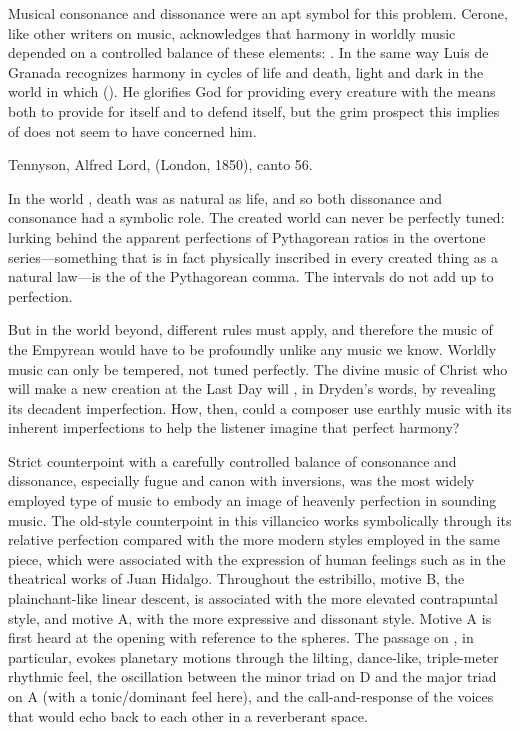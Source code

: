 Musical consonance and dissonance were an apt symbol for this problem.
Cerone, like other writers on music, acknowledges that harmony in worldly music
depended on a controlled balance of these elements: .%
    \Autocite[616]{Cerone:Melopeo}
In the same way Luis de Granada recognizes harmony in cycles of life and
death, light and dark in the world in which  ().%
    \Autocite[191]{LuisdeGranada:Simbolo}
He glorifies God for providing every creature with the means both to provide
for itself and to defend itself, but the grim prospect this implies of
 does not seem to have concerned him.%
\begin{Footnote}
    Tennyson, Alfred Lord,  (London, 1850), canto
    56.
\end{Footnote}
In the world , death was as natural as life, and so both
dissonance and consonance had a symbolic role.
The created world can never be perfectly tuned: lurking behind the apparent
perfections of Pythagorean ratios in the overtone series---something that is in
fact physically inscribed in every created thing as a natural law---is the
 of the Pythagorean comma.
The intervals do not add up to perfection.


But in the world beyond, different rules must apply, and therefore the
music of the Empyrean would have to be profoundly unlike any music we know.
Worldly music can only be tempered, not tuned perfectly.
The divine music of Christ who will make a new creation at the Last Day will
, in Dryden's words, by revealing its decadent
imperfection.
How, then, could a composer use earthly music with its inherent imperfections
to help the listener imagine that perfect harmony?

Strict counterpoint with a carefully controlled balance of consonance and
dissonance, especially fugue and canon with inversions, was the most widely
employed type of music to embody an image of heavenly perfection in sounding
music.
The old-style counterpoint in this villancico works symbolically through its
relative perfection compared with the more modern styles employed in the same
piece, which were associated with the expression of human feelings such as in
the theatrical works of Juan Hidalgo.
Throughout the estribillo, motive B, the plainchant-like linear descent, is
associated with the more elevated contrapuntal style, and motive A, with the
more expressive and dissonant style.
Motive A is first heard at the opening with reference to the spheres.
The passage on , in particular, evokes
planetary motions through the lilting, dance-like, triple-meter rhythmic feel,
the oscillation between the minor triad on D and the major triad on A (with a
tonic/dominant feel here), and the call-and-response of the voices that would
echo back to each other in a reverberant space.

